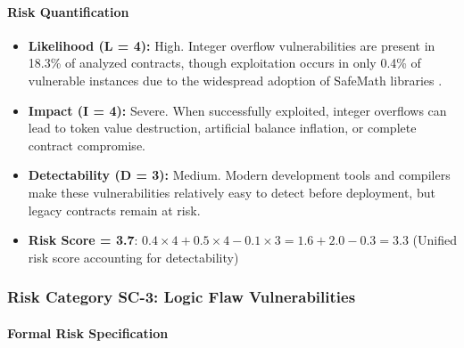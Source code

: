 \paragraph{Risk Quantification}

\begin{itemize}
\item \textbf{Likelihood (L = 4):} High. Integer overflow vulnerabilities are present in 18.3\% of analyzed contracts, though exploitation occurs in only 0.4\% of vulnerable instances due to the widespread adoption of SafeMath libraries \cite{perez2021analysis}.

\item \textbf{Impact (I = 4):} Severe. When successfully exploited, integer overflows can lead to token value destruction, artificial balance inflation, or complete contract compromise.

\item \textbf{Detectability (D = 3):} Medium. Modern development tools and compilers make these vulnerabilities relatively easy to detect before deployment, but legacy contracts remain at risk.

\item \textbf{Risk Score = 3.7}: $0.4 \times 4 + 0.5 \times 4 - 0.1 \times 3 = 1.6 + 2.0 - 0.3 = 3.3$ (Unified risk score accounting for detectability)
\end{itemize}

\subsubsection{Risk Category SC-3: Logic Flaw Vulnerabilities}

\paragraph{Formal Risk Specification}

